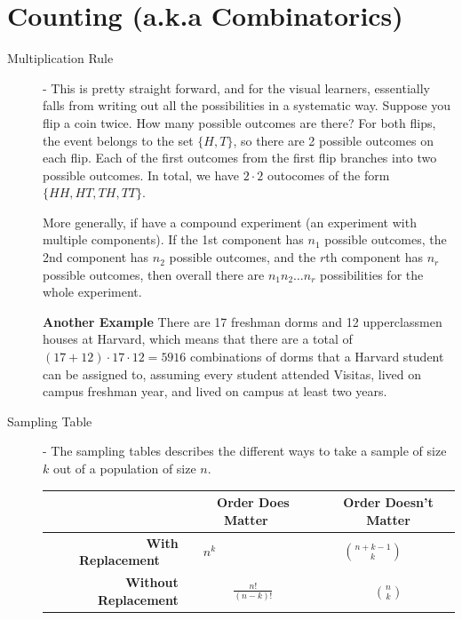 \documentclass[11pt]{article}
\begin{document}
\section*{Counting (a.k.a Combinatorics)}
\begin{description}
	\item[Multiplication Rule] - This is pretty straight forward, and for the visual learners, essentially falls from writing out all the possibilities in a systematic way. Suppose you flip a coin twice. How many possible outcomes are there? For both flips, the event belongs to the set $\{H,T\}$, so there are 2 possible outcomes on each flip. Each of the first outcomes from the first flip branches into two possible outcomes. In total, we have $2 \cdot 2$ outocomes of the form $\{HH, HT, TH, TT\}$.

More generally, if have a compound experiment (an experiment with multiple components). If the 1st component has $n_1$ possible outcomes, the 2nd component has $n_2$ possible outcomes, and the $r$th component has $n_r$ possible outcomes, then overall there are $n_1n_2 \dots n_r$ possibilities for the whole experiment.

\textbf{Another Example} There are 17 freshman dorms and 12 upperclassmen houses at Harvard, which means that there are a total of $(17 + 12) \cdot 17 \cdot 12 = 5916$ combinations of dorms that a Harvard student can be assigned to, assuming every student attended Visitas, lived on campus freshman year, and lived on campus at least two years.
	\item[Sampling Table] - The sampling tables describes the different ways to take a sample of size $k$ out of a population of size $n$.\\
		\begin{table}[htb!]
		\begin{center}
	    	    \setlength{\extrarowheight}{1pt}
			\begin{tabular}{r|cc}
				 & \textbf{Order Does Matter}~~ & \textbf{Order Doesn't Matter} \\ \hline
				\textbf{With Replacement}~~~ & $\displaystyle n^k$~~~~~~~~~~~~~~ & $\displaystyle{n+k-1 \choose k}$~~~~~ \\
				\textbf{Without Replacement} & $\displaystyle\frac{n!}{(n - k)!}$ & $\displaystyle{n \choose k}$
			\end{tabular}
		\end{center}
		\end{table}
\end{description}
\end{document}
